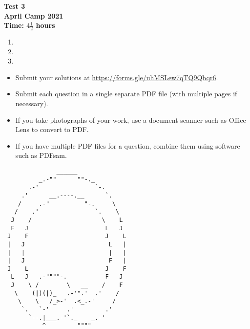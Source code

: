 \documentclass{article}
\begin{document}
\thispagestyle{empty}

\begin{center}
  \textbf{\Large Test 3}
  \\ \vspace{1em}
  \textbf{\large April Camp 2021}
  \\ \vspace{1em}
  \textbf{\large Time: $4\frac{1}{2}$ hours}
\end{center}

\vfill

\begin{enumerate}[leftmargin=0pt, itemsep=18pt]

\item


\item


\item

\end{enumerate}


\vfill
\vfill
\begin{itemize}
	\item Submit your solutions at \url{https://forms.gle/uhMSLew7qTQ9Qbqr6}.
	\item Submit each question in a single separate PDF file (with multiple pages if necessary).
	\item If you take photographs of your work, use a document scanner such as Office Lens to convert to PDF.
	\item If you have multiple PDF files for a question, combine them using software such as PDFsam.
\end{itemize}

\vfill
\centering
\begin{BVerbatim}
               ______
          _.-""      ""-._
       .-'                `-.
     .'      __.----.__      `.
    /     .-"          "-.     \
   /    .'                `.    \
  J    /                    \    L
  F   J                      L   J
 J    F                      J    L
 |   J                        L   |
 |   |                        |   |
 |   J                        F   |
 J    L                      J    F
  L   J   .-""""-.           F   J
  J    \ /        \   __    /    F
   \    (|)(|)_   .-'".'  .'    /
    \    \   /_>-'  .<_.-'     /
     `.   `-'     .'         .'
       `--.|___.-'`._    _.-'
           ^         """"
\end{BVerbatim}
\end{document}
